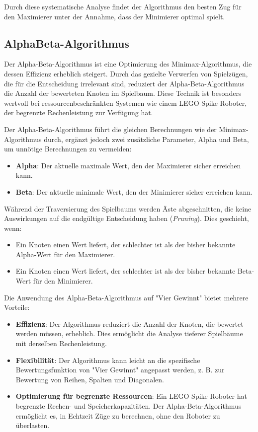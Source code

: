 Durch diese systematische Analyse findet der Algorithmus den besten Zug für den Maximierer unter der Annahme, dass der Minimierer optimal spielt.



\subsection{AlphaBeta-Algorithmus}

Der Alpha-Beta-Algorithmus ist eine Optimierung des Minimax-Algorithmus, die dessen Effizienz erheblich steigert. Durch das gezielte Verwerfen von Spielzügen, die für die Entscheidung irrelevant sind, reduziert der Alpha-Beta-Algorithmus die Anzahl der bewerteten Knoten im Spielbaum. Diese Technik ist besonders wertvoll bei ressourcenbeschränkten Systemen wie einem LEGO Spike Roboter, der begrenzte Rechenleistung zur Verfügung hat.

Der Alpha-Beta-Algorithmus führt die gleichen Berechnungen wie der Minimax-Algorithmus durch, ergänzt jedoch zwei zusätzliche Parameter, Alpha und Beta, um unnötige Berechnungen zu vermeiden:

\begin{itemize}
	\item \textbf{Alpha}: Der aktuelle maximale Wert, den der Maximierer sicher erreichen kann.
	\item \textbf{Beta}: Der aktuelle minimale Wert, den der Minimierer sicher erreichen kann.
\end{itemize}

Während der Traversierung des Spielbaums werden Äste abgeschnitten, die keine Auswirkungen auf die endgültige Entscheidung haben (\textit{Pruning}). Dies geschieht, wenn:
\begin{itemize}
	\item Ein Knoten einen Wert liefert, der schlechter ist als der bisher bekannte Alpha-Wert für den Maximierer.
	\item Ein Knoten einen Wert liefert, der schlechter ist als der bisher bekannte Beta-Wert für den Minimierer.
\end{itemize}

Die Anwendung des Alpha-Beta-Algorithmus auf "Vier Gewinnt" bietet mehrere Vorteile:
\begin{itemize}
	\item \textbf{Effizienz}: Der Algorithmus reduziert die Anzahl der Knoten, die bewertet werden müssen, erheblich. Dies ermöglicht die Analyse tieferer Spielbäume mit derselben Rechenleistung.
	\item \textbf{Flexibilität}: Der Algorithmus kann leicht an die spezifische Bewertungsfunktion von "Vier Gewinnt" angepasst werden, z. B. zur Bewertung von Reihen, Spalten und Diagonalen.
	\item \textbf{Optimierung für begrenzte Ressourcen}: Ein LEGO Spike Roboter hat begrenzte Rechen- und Speicherkapazitäten. Der Alpha-Beta-Algorithmus ermöglicht es, in Echtzeit Züge zu berechnen, ohne den Roboter zu überlasten.
\end{itemize}

